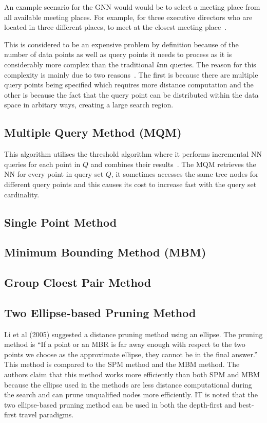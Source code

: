 \documentclass[a4paper,11pt]{article}
\begin{document}
An example scenario for the GNN would would be to select a meeting place from all available meeting places. For example, for three executive directors who are located in three different places, to meet at the closest meeting place~\cite{taniar2013taxonomy}.

This is considered to be an expensive problem by definition because of the number of data points as well as query points it needs to process as it is considerably more complex than the traditional \textit{k}nn queries. The reason for this complexity is mainly due to two reasons~\cite{li2005two}. The first is because there are multiple query points being specified which requires more distance computation and the other is because the fact that the query point can be distributed within the data space in arbitary ways, creating a large search region.


\subsection{Multiple Query Method (MQM)}

This algorithm utilises the threshold algorithm where it performs incremental NN queries for each point in $Q$ and combines their results~\cite{papadias2004group}. The MQM retrieves the NN for every point in query set $Q$, it sometimes accesses the same tree nodes for different query points and this causes its cost to increase fast with the query set cardinality.

\subsection{Single Point Method}

\subsection{Minimum Bounding Method (MBM)}

\subsection{Group Cloest Pair Method}

\subsection{Two Ellipse-based Pruning Method}

Li et al (2005) suggested a distance pruning method using an ellipse. The pruning method is ``If a point or an MBR is far away enough with respect to the two points we choose as the approximate ellipse, they cannot be in the final answer.'' This method is compared to the SPM method and the MBM method. The authors claim that this method works more efficiently than both SPM and MBM because the ellipse used in the methods are less distance computational during the search and can prune unqualified nodes more efficiently. IT is noted that the two ellipse-based pruning method can be used in both the depth-first and best-first travel paradigms.
\end{document}
